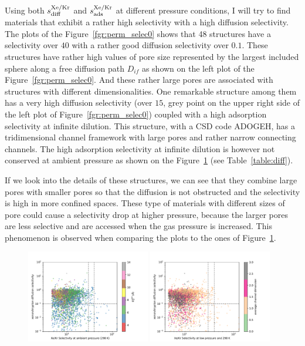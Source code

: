 \documentclass[main]{subfiles}
\begin{document}
Using both $s^{\text{Xe/Kr}}_{\text{diff}}$ and $s^{\text{Xe/Kr}}_{\text{ads}}$ at different pressure conditions, I will try to find materials that exhibit a rather high selectivity with a high diffusion selectivity. The plots of the Figure~\ref{fgr:perm_selec0} shows that 48 structures have a selectivity over $40$ with a rather good diffusion selectivity over $0.1$. These structures have rather high values of pore size represented by the largest included sphere along a free diffusion path $D_{if}$ as shown on the left plot of the Figure~\ref{fgr:perm_selec0}. And these rather large pores are associated with structures with different dimensionalities.
One remarkable structure among them has a very high diffusion selectivity (over $15$, grey point on the upper right side of the left plot of Figure~\ref{fgr:perm_selec0}) coupled with a high adsorption selectivity at infinite dilution. This structure, with a CSD code ADOGEH\cite{Peikert_2012}, has a tridimensional channel framework with large pores and rather narrow connecting channels. The high adsorption selectivity at infinite dilution is however not conserved at ambient pressure as shown on the Figure~\ref{fgr:perm_selec2080}  (see Table~\ref{table:diff}).

If we look into the details of these structures, we can see that they combine large pores with smaller pores so that the diffusion is not obstructed and the selectivity is high in more confined spaces. These type of materials with different sizes of pore could cause a selectivity drop at higher pressure, because the larger pores are less selective and are accessed when the gas pressure is increased. This phenomenon is observed when comparing the plots to the ones of Figure~\ref{fgr:perm_selec2080}.

\begin{figure}[ht]
  \centering
    \includegraphics[width=0.48\textwidth]{figures/5-diffusion/diff_D_xekr-s2080-lcd.pdf}
    \includegraphics[width=0.48\textwidth]{figures/5-diffusion/diff_D_xekr-s2080-chandim.pdf}
    \caption{}\label{fgr:perm_selec2080}
\end{figure}
\end{document}
